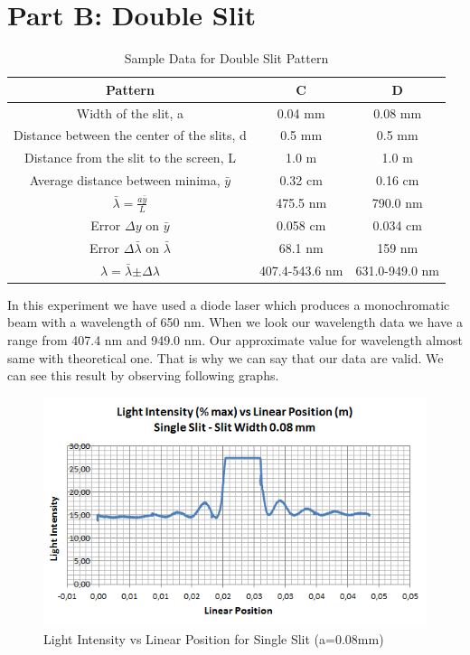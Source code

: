 \documentclass[a4paper,12pt]{report}
\begin{document}
\section{Part B: Double Slit}
\begin{table}[h]
	\begin{center}
		\begin{tabular}{|c|c|c|}
			\hline Pattern & C & D \\ 
			\hline Width of the slit, a & 0.04 mm & 0.08 mm \\
			\hline Distance between the center of the slits, d & 0.5 mm & 0.5 mm \\ 
			\hline Distance from the slit to the screen, L & 1.0 m & 1.0 m \\ 
			\hline Average distance between minima, $\bar{y}$ & 0.32 cm & 0.16 cm \\ 
			\hline $\bar{\lambda}=\frac{a\bar{y}}{L}$ & 475.5 nm & 790.0 nm \\ 
			\hline Error $\Delta y$ on $\bar{y}$ & 0.058 cm & 0.034 cm \\ 
			\hline Error $\Delta \bar{\lambda}$ on $\bar{\lambda}$ & 68.1 nm & 159 nm \\ 
			\hline $\lambda=\bar{\lambda}$$\pm$$\Delta\lambda$ & 407.4-543.6 nm & 631.0-949.0 nm \\ 
			\hline 
		\end{tabular} 
		
	\end{center}
	\caption{Sample Data for Double Slit Pattern}
\end{table}
In this experiment we have used a diode laser which produces a monochromatic beam with a wavelength of 650 nm. When we look our wavelength data we have a range from 407.4 nm and 949.0 nm. Our approximate value for wavelength almost same with theoretical one. That is why we can say that our data are valid. We can see this result by observing following graphs.
\begin{figure}[h]
\centering
\includegraphics[width=1.0\linewidth, height=0.39\textheight]{1}
\caption{Light Intensity vs Linear Position for Single Slit (a=0.08mm)}
\label{fig:1}
\end{figure}
\end{document}

